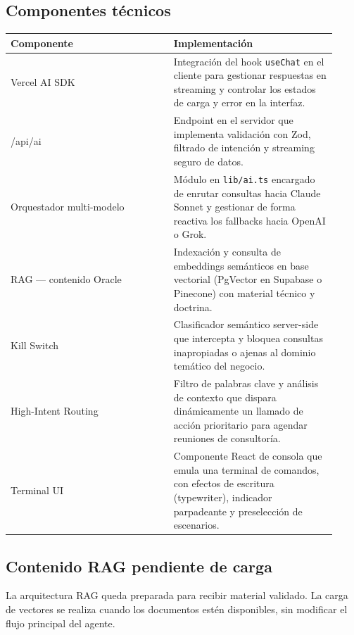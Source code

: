 \documentclass[11pt,letterpaper]{article}
\begin{document}
\subsection{Componentes técnicos}

\begin{longtable}{p{0.46\linewidth}p{0.46\linewidth}}
\toprule
\textbf{Componente} & \textbf{Implementación} \\
\midrule
Vercel AI SDK & Integración del hook \texttt{useChat} en el cliente para gestionar respuestas en streaming y controlar los estados de carga y error en la interfaz. \\
/api/ai & Endpoint en el servidor que implementa validación con Zod, filtrado de intención y streaming seguro de datos. \\
Orquestador multi-modelo & Módulo en \texttt{lib/ai.ts} encargado de enrutar consultas hacia Claude Sonnet y gestionar de forma reactiva los fallbacks hacia OpenAI o Grok. \\
RAG — contenido Oracle & Indexación y consulta de embeddings semánticos en base vectorial (PgVector en Supabase o Pinecone) con material técnico y doctrina. \\
Kill Switch & Clasificador semántico server-side que intercepta y bloquea consultas inapropiadas o ajenas al dominio temático del negocio. \\
High-Intent Routing & Filtro de palabras clave y análisis de contexto que dispara dinámicamente un llamado de acción prioritario para agendar reuniones de consultoría. \\
Terminal UI & Componente React de consola que emula una terminal de comandos, con efectos de escritura (typewriter), indicador parpadeante y preselección de escenarios. \\
\bottomrule
\end{longtable}

\subsection{Contenido RAG pendiente de carga}

La arquitectura RAG queda preparada para recibir material validado. La carga de vectores se realiza cuando los documentos estén disponibles, sin modificar el flujo principal del agente.
\end{document}
